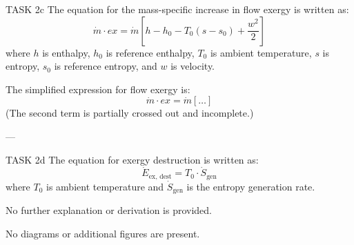 TASK 2c  
The equation for the mass-specific increase in flow exergy is written as:  
\[
\dot{m} \cdot ex = \dot{m} \left[ h - h_0 - T_0 (s - s_0) + \frac{w^2}{2} \right]
\]  
where \( h \) is enthalpy, \( h_0 \) is reference enthalpy, \( T_0 \) is ambient temperature, \( s \) is entropy, \( s_0 \) is reference entropy, and \( w \) is velocity.  

The simplified expression for flow exergy is:  
\[
\dot{m} \cdot ex = \dot{m} \left[ \ldots \right]
\]  
(The second term is partially crossed out and incomplete.)

---

TASK 2d  
The equation for exergy destruction is written as:  
\[
\dot{E}_{\text{ex, dest}} = T_0 \cdot \dot{S}_{\text{gen}}
\]  
where \( T_0 \) is ambient temperature and \( \dot{S}_{\text{gen}} \) is the entropy generation rate.  

No further explanation or derivation is provided.  

No diagrams or additional figures are present.